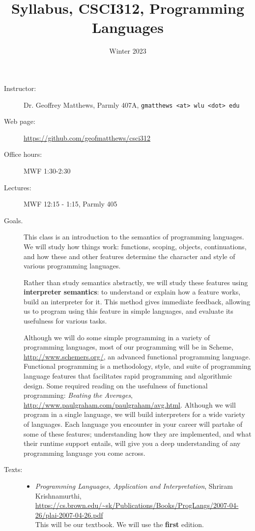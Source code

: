 \documentclass{article}
\title{
Syllabus, CSCI312, Programming Languages
}
\author{Winter 2023}
\date{}
\newcommand{\myitem}[1]{\item[#1]}
\begin{document}
\maketitle

\begin{description}

\myitem{Instructor:}
Dr. Geoffrey Matthews,
Parmly 407A, {\tt gmatthews <at>  wlu <dot> edu}

\myitem{Web page:} \url{https://github.com/geofmatthews/csci312} 

\myitem{Office hours:} MWF 1:30-2:30

\myitem{Lectures:} MWF 12:15 - 1:15, Parmly 405

\myitem{Goals.}  This class is an introduction to the semantics of
programming languages.  We will study how things work: functions,
scoping, objects, continuations, and how these and other features
determine the character and style of various programming languages.

Rather than study semantics abstractly,
we will study these features using {\bf interpreter semantics}: 
to understand or explain how a feature works, build an interpreter
for it.  This method gives immediate feedback, allowing
us to program using this feature in simple languages,
and evaluate its usefulness  for various tasks.

Although we will do some simple programming in
a variety of programming languages, most of our programming will be in
Scheme, \url{http://www.schemers.org/}, an advanced functional
programming language.  Functional programming is a methodology, style,
and suite of programming language features that facilitates rapid
programming and algorithmic design.  Some required reading on the
usefulness of functional programming: {\em Beating the Averages},
\url{http://www.paulgraham.com/paulgraham/avg.html}.  Although we will
program in a single language, we will build interpreters for a wide
variety of languages.  Each language you encounter in your career will
partake of some of these features; understanding how they are
implemented, and what their runtime support entails, will give you a
deep understanding of any programming language you come across.


\myitem{Texts:}
\begin{itemize}
\item {\em Programming Languages, Application and Interpretation},
  Shriram Krishnamurthi,\\
\url{https://cs.brown.edu/~sk/Publications/Books/ProgLangs/2007-04-26/plai-2007-04-26.pdf}\\
This will be our textbook.  We will use the {\bf first} edition.


\end{itemize}
\end{description}
\end{document}
